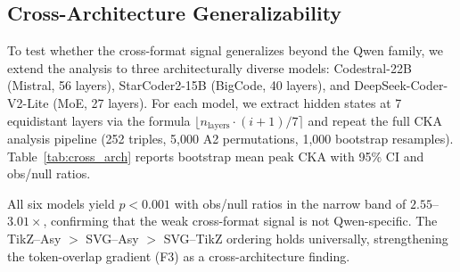 \subsection{Cross-Architecture Generalizability}
\label{sec:generalizability}

To test whether the cross-format signal generalizes beyond the Qwen family, we extend the analysis to three architecturally diverse models: Codestral-22B (Mistral, 56 layers), StarCoder2-15B (BigCode, 40 layers), and DeepSeek-Coder-V2-Lite (MoE, 27 layers).
For each model, we extract hidden states at 7 equidistant layers via the formula $\lfloor n_\text{layers} \cdot (i+1)/7 \rceil$ and repeat the full CKA analysis pipeline (252 triples, 5{,}000 A2 permutations, 1{,}000 bootstrap resamples).
Table~\ref{tab:cross_arch} reports bootstrap mean peak CKA with 95\% CI and obs/null ratios.

\begin{table}[!ht]
\centering
\small
\caption{Cross-architecture CKA summary (6 models, 4 architecture families). Peak CKA is the bootstrap mean at the highest-CKA layer. Obs/null ratio is the A2 permutation effect size.}
\label{tab:cross_arch}
\end{table}

All six models yield $p < 0.001$ with obs/null ratios in the narrow band of $2.55$--$3.01\times$, confirming that the weak cross-format signal is not Qwen-specific.
The TikZ--Asy $>$ SVG--Asy $>$ SVG--TikZ ordering holds universally, strengthening the token-overlap gradient (F3) as a cross-architecture finding.

